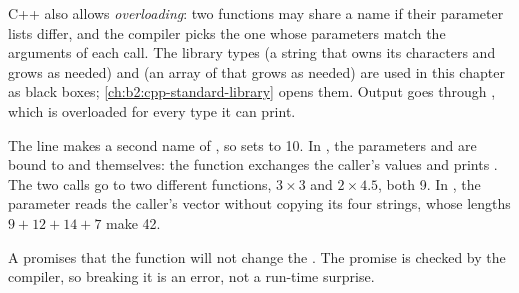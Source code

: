 C++ also allows \emph{overloading}: two functions may share a name if their parameter lists differ, and the
compiler picks the one whose parameters match the arguments of each call. The library types 
(a string that owns its characters and grows as needed) and  (an array of  that grows
as needed) are used in this chapter as black boxes; \cref{ch:b2:cpp-standard-library} opens them. Output goes
through , which is overloaded for every type it can print.

\label{lst:b2:cpp-classes-raii:references}

\label{out:b2:cpp-classes-raii:references}

\begin{example}\label{ex:b2:cpp-classes-raii:references}
The line  makes  a second name of , so  sets  to 10. In
, the parameters  and  are bound to  and  themselves: the
function exchanges the caller's values and  prints . The two  calls go to
two different functions, $3 \times 3$ and $2 \times 4.5$, both 9. In , the parameter
 reads the caller's vector without copying its four strings, whose
lengths $9 + 12 + 14 + 7$ make 42.
\end{example}

A   promises that the function will not change the . The promise is checked by the
compiler, so breaking it is an error, not a run-time surprise.

\label{lst:b2:cpp-classes-raii:const-error}

\label{out:b2:cpp-classes-raii:const-error}

